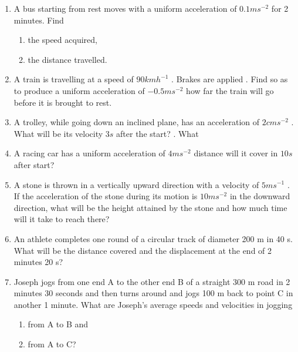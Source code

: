 \renewcommand{\theequation}{\theenumi}
\begin{enumerate}[label=\arabic*.,ref=\thesection.\theenumi]

\item A bus starting from rest moves with a uniform acceleration of $0.1 m s^{-2}$
for 2 minutes. Find 

\begin{enumerate} 
\item the speed acquired, 
\item the distance travelled.
\end{enumerate}

\item A train is travelling at a speed of $90 km h^{-1}$
. Brakes are applied . Find
so as to produce a uniform acceleration of $- 0.5 m s^{-2}$
how far the train will go before it is brought to rest.
\item  A trolley, while going down an inclined plane, has an acceleration of $2 cm s^{-2}$
. What will
be its velocity $3 s$ after the start? . What
\item  A racing car has a uniform acceleration of $4 m s^{-2}$
distance will it cover in $10 s$ after start?
\item  A stone is thrown in a vertically upward direction with a velocity of $5 m s^{-1}$
. If the acceleration of the
stone during its motion is $10 m s^{-2}$ in the downward direction, what will be the height attained by the stone and how much time will it take to reach there?

\item An athlete completes one round of a circular track of diameter 200 m in 40 s. What will be the distance covered and the displacement at the end of 2 minutes 20 s?
\item  Joseph jogs from one end A to the other end B of a straight 300 m road in 2 minutes 30 seconds and then turns around
and jogs 100 m back to point C in another 1 minute. What are Joseph's average speeds and velocities in jogging 

\begin{enumerate} 
\item from A to B and 
\item from A to C?
\end{enumerate}


\end{enumerate}
